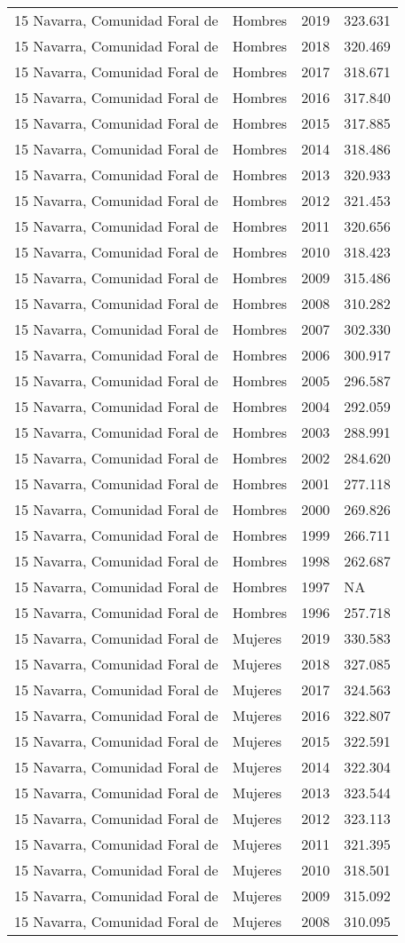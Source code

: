\documentclass[
]{article}
\begin{document}
\begin{longtable}[]{@{}llrl@{}}
15 Navarra, Comunidad Foral de & Hombres & 2019 & 323.631\tabularnewline
15 Navarra, Comunidad Foral de & Hombres & 2018 & 320.469\tabularnewline
15 Navarra, Comunidad Foral de & Hombres & 2017 & 318.671\tabularnewline
15 Navarra, Comunidad Foral de & Hombres & 2016 & 317.840\tabularnewline
15 Navarra, Comunidad Foral de & Hombres & 2015 & 317.885\tabularnewline
15 Navarra, Comunidad Foral de & Hombres & 2014 & 318.486\tabularnewline
15 Navarra, Comunidad Foral de & Hombres & 2013 & 320.933\tabularnewline
15 Navarra, Comunidad Foral de & Hombres & 2012 & 321.453\tabularnewline
15 Navarra, Comunidad Foral de & Hombres & 2011 & 320.656\tabularnewline
15 Navarra, Comunidad Foral de & Hombres & 2010 & 318.423\tabularnewline
15 Navarra, Comunidad Foral de & Hombres & 2009 & 315.486\tabularnewline
15 Navarra, Comunidad Foral de & Hombres & 2008 & 310.282\tabularnewline
15 Navarra, Comunidad Foral de & Hombres & 2007 & 302.330\tabularnewline
15 Navarra, Comunidad Foral de & Hombres & 2006 & 300.917\tabularnewline
15 Navarra, Comunidad Foral de & Hombres & 2005 & 296.587\tabularnewline
15 Navarra, Comunidad Foral de & Hombres & 2004 & 292.059\tabularnewline
15 Navarra, Comunidad Foral de & Hombres & 2003 & 288.991\tabularnewline
15 Navarra, Comunidad Foral de & Hombres & 2002 & 284.620\tabularnewline
15 Navarra, Comunidad Foral de & Hombres & 2001 & 277.118\tabularnewline
15 Navarra, Comunidad Foral de & Hombres & 2000 & 269.826\tabularnewline
15 Navarra, Comunidad Foral de & Hombres & 1999 & 266.711\tabularnewline
15 Navarra, Comunidad Foral de & Hombres & 1998 & 262.687\tabularnewline
15 Navarra, Comunidad Foral de & Hombres & 1997 & NA\tabularnewline
15 Navarra, Comunidad Foral de & Hombres & 1996 & 257.718\tabularnewline
15 Navarra, Comunidad Foral de & Mujeres & 2019 & 330.583\tabularnewline
15 Navarra, Comunidad Foral de & Mujeres & 2018 & 327.085\tabularnewline
15 Navarra, Comunidad Foral de & Mujeres & 2017 & 324.563\tabularnewline
15 Navarra, Comunidad Foral de & Mujeres & 2016 & 322.807\tabularnewline
15 Navarra, Comunidad Foral de & Mujeres & 2015 & 322.591\tabularnewline
15 Navarra, Comunidad Foral de & Mujeres & 2014 & 322.304\tabularnewline
15 Navarra, Comunidad Foral de & Mujeres & 2013 & 323.544\tabularnewline
15 Navarra, Comunidad Foral de & Mujeres & 2012 & 323.113\tabularnewline
15 Navarra, Comunidad Foral de & Mujeres & 2011 & 321.395\tabularnewline
15 Navarra, Comunidad Foral de & Mujeres & 2010 & 318.501\tabularnewline
15 Navarra, Comunidad Foral de & Mujeres & 2009 & 315.092\tabularnewline
15 Navarra, Comunidad Foral de & Mujeres & 2008 & 310.095\tabularnewline

\end{longtable}
\end{document}
